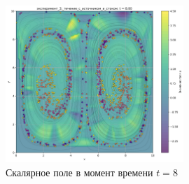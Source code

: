\begin{figure}[h]
	\centering
	\includegraphics[width=0.6\textwidth]{imgs/lg/эксперимент_3:_течение_с_источником_и_стоком_t8.00.png}
	\caption{Скалярное поле в момент времени $t=8$}
\end{figure}